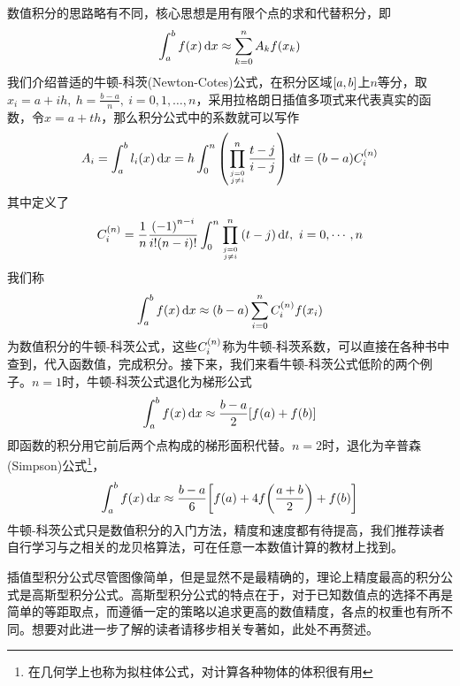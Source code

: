 \documentclass[12pt,a4paper,openany,twoside]{book}
\numberwithin{equation}{section}
\begin{document}
          数值积分的思路略有不同，核心思想是用有限个点的求和代替积分，即
          \begin{equation}
            \int_a^b{f\qty(x)\dd{x}}\approx\sum_{k=0}^n{A_k f\qty(x_k)}
          \end{equation}
          我们介绍普适的牛顿-科茨(Newton-Cotes)公式，在积分区域$\qty[a,b]$上$n$等分，取$x_i=a+ih,\ h=\frac{b-a}{n},\ i=0,1,\dots,n$，采用拉格朗日插值多项式来代表真实的函数，令$x=a+th$，那么积分公式中的系数就可以写作
          \begin{equation}
            A_i=\int_a^b{l_i\qty(x)\dd{x}}=h\int_0^n{\qty(\prod_{j=0 \atop j \neq i}^n{\frac{t-j}{i-j}}) \dd{t}}=\qty(b-a) C_i^\qty(n)
          \end{equation}
          其中定义了
          \begin{equation}
            C_i^\qty(n)=\frac{1}{n} \frac{\qty(-1)^{n-i}}{i !\qty(n-i) !} \int_0^n{\prod_{j=0 \atop j \neq i}^n{\qty(t-j)}\dd{t}},\ i=0,\cdots,n
          \end{equation}
          我们称
          \begin{equation}
            \int_a^b{f\qty(x)\dd{x}}\approx\qty(b-a)\sum_{i=0}^n{C_i^\qty(n)f\qty(x_i)}
          \end{equation}
          为数值积分的牛顿-科茨公式，这些$C_i^\qty(n)$称为牛顿-科茨系数，可以直接在各种书中查到，代入函数值，完成积分。接下来，我们来看牛顿-科茨公式低阶的两个例子。$n=1$时，牛顿-科茨公式退化为梯形公式
          \begin{equation}
            \int_a^b{f\qty(x)\dd{x}}\approx\frac{b-a}{2}\qty[f\qty(a)+f\qty(b)]
          \end{equation}
          即函数的积分用它前后两个点构成的梯形面积代替。$n=2$时，退化为辛普森(Simpson)公式\footnote{在几何学上也称为拟柱体公式，对计算各种物体的体积很有用}，
          \begin{equation}
            \int_a^b{f\qty(x)\dd{x}}\approx\frac{b-a}{6}\qty[f\qty(a)+4f\qty(\frac{a+b}{2})+f\qty(b)]
          \end{equation}
          牛顿-科茨公式只是数值积分的入门方法，精度和速度都有待提高，我们推荐读者自行学习与之相关的龙贝格算法，可在任意一本数值计算的教材上找到。

          插值型积分公式尽管图像简单，但是显然不是最精确的，理论上精度最高的积分公式是高斯型积分公式。高斯型积分公式的特点在于，对于已知数值点的选择不再是简单的等距取点，而遵循一定的策略以追求更高的数值精度，各点的权重也有所不同。想要对此进一步了解的读者请移步相关专著如\cite{numerical_calc_methods}，此处不再赘述。
\end{document}
